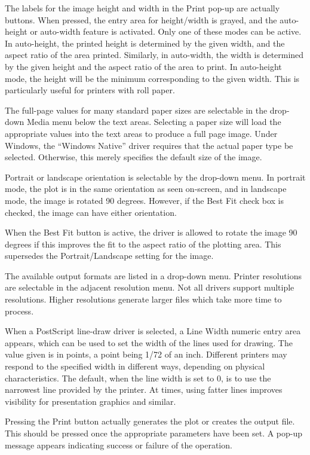 The labels for the image height and width in the {\cb Print} pop-up
are actually buttons.  When pressed, the entry area for height/width
is grayed, and the auto-height or auto-width feature is activated. 
Only one of these modes can be active.  In auto-height, the printed
height is determined by the given width, and the aspect ratio of the
area printed.  Similarly, in auto-width, the width is determined by
the given height and the aspect ratio of the area to print.  In
auto-height mode, the height will be the minimum corresponding to the
given width.  This is particularly useful for printers with roll
paper.

The full-page values for many standard paper sizes are selectable in
the drop-down {\cb Media} menu below the text areas.  Selecting a
paper size will load the appropriate values into the text areas to
produce a full page image.  Under Windows, the ``Windows Native''
driver requires that the actual paper type be selected.  Otherwise,
this merely specifies the default size of the image.

Portrait or landscape orientation is selectable by the drop-down menu. 
In portrait mode, the plot is in the same orientation as seen
on-screen, and in landscape mode, the image is rotated 90 degrees. 
However, if the {\cb Best Fit} check box is checked, the image can
have either orientation.

When the {\cb Best Fit} button is active, the driver is allowed to
rotate the image 90 degrees if this improves the fit to the aspect
ratio of the plotting area.  This supersedes the Portrait/Landscape
setting for the image.

The available output formats are listed in a drop-down menu.  Printer
resolutions are selectable in the adjacent resolution menu.  Not all
drivers support multiple resolutions.  Higher resolutions generate
larger files which take more time to process.

When a PostScript line-draw driver is selected, a {\cb Line Width}
numeric entry area appears, which can be used to set the width of the
lines used for drawing.  The value given is in points, a point being
1/72 of an inch.  Different printers may respond to the specified 
width in different ways, depending on physical characteristics.  The
default, when the line width is set to 0, is to use the narrowest line
provided by the printer.  At times, using fatter lines improves
visibility for presentation graphics and similar.

Pressing the {\cb Print} button actually generates the plot or creates
the output file.  This should be pressed once the appropriate
parameters have been set.  A pop-up message appears indicating success
or failure of the operation.

